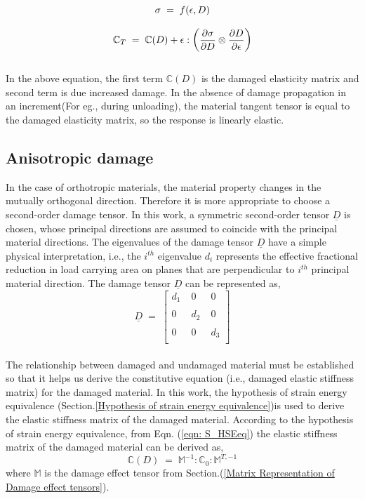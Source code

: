 \documentclass[a4paper,12pt,twoside]{report}
\begin{document}
\begin{equation*}
\large{\sigma  \; = \; f(\epsilon, D) }
\end{equation*}

\begin{equation}
\large{\mathbb{C}_{T}  \; = \; \mathbb{C}(D) + \epsilon : \Big(\frac{\partial \sigma }{\partial D} \otimes \frac{\partial D}{\partial \epsilon}  \Big)    }
\end{equation}
\\
In the above equation, the first term $\mathbb{C}(D)$ is the damaged elasticity matrix and second term is due increased damage. In the absence of damage propagation in an increment(For eg., during unloading), the material tangent tensor is equal to the damaged elasticity matrix, so the response is linearly elastic.
\subsection{Anisotropic damage}
\indent\indent\indent In the case of orthotropic materials, the material property changes in the mutually orthogonal direction. Therefore it is more appropriate to choose a second-order damage tensor. In this work, a symmetric second-order tensor $\underline{D}$ is chosen, whose principal directions are assumed to coincide with the principal material directions. The eigenvalues of the damage tensor $\underline{D}$ have a simple physical interpretation, i.e., the $i^{th}$ eigenvalue $d_{i}$ represents the effective fractional reduction in load carrying area on planes that are perpendicular to $i^{th}$ principal material direction. The damage tensor $\underline{D}$ can be represented as,
\\
$$
\underline{D} \; = \; 
 \begin{bmatrix}
  d_{1}  \;& 0  \; & 0  \\
  \\
  0 \; & d_{2} \; & 0  \\
  \\  
  0 \; & 0 \; & d_{3} \\
  
 \end{bmatrix}
 $$  
\\
The relationship between damaged and undamaged material must be established so that it helps us derive the constitutive equation (i.e., damaged elastic stiffness matrix) for the damaged material. In this work, the hypothesis of strain energy equivalence (Section.\ref{Hypothesis of strain energy equivalence})is used to derive the elastic stiffness matrix of the damaged material. According to the hypothesis of strain energy equivalence, from Eqn. (\ref{eqn: S_HSEeq}) the elastic stiffness matrix of the damaged material can be derived as,\\
\begin{equation}
\mathbb{C}(D) \; = \; \mathbb{M}^{-1} : \mathbb{C}_{0} :  \mathbb{M}^{T,-1}  
\label{Damaged_elasticity_matrix_1}
\end{equation}
where $\mathbb{M}$ is the damage effect tensor from Section.(\ref{Matrix Representation of Damage effect tensors}). 
\end{document}
